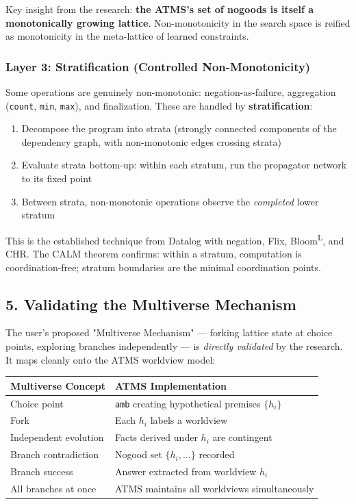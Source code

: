 \documentclass[11pt]{article}
\begin{document}
Key insight from the research: \textbf{the ATMS's set of nogoods is itself a
monotonically growing lattice}. Non-monotonicity in the search space is
reified as monotonicity in the meta-lattice of learned constraints.
\subsubsection{Layer 3: Stratification (Controlled Non-Monotonicity)}
\label{sec:orgcf440ca}

Some operations are genuinely non-monotonic: negation-as-failure,
aggregation (\texttt{count}, \texttt{min}, \texttt{max}), and finalization. These are handled
by \textbf{stratification}:

\begin{enumerate}
\item Decompose the program into strata (strongly connected components of
the dependency graph, with non-monotonic edges crossing strata)
\item Evaluate strata bottom-up: within each stratum, run the propagator
network to its fixed point
\item Between strata, non-monotonic operations observe the \emph{completed} lower
stratum
\end{enumerate}

This is the established technique from Datalog with negation, Flix,
Bloom\textsuperscript{L}, and CHR. The CALM theorem confirms: within a stratum,
computation is coordination-free; stratum boundaries are the minimal
coordination points.
\subsection{5. Validating the Multiverse Mechanism}
\label{sec:orga314ea8}

The user's proposed "Multiverse Mechanism" --- forking lattice state at
choice points, exploring branches independently --- is \emph{directly validated}
by the research. It maps cleanly onto the ATMS worldview model:

\begin{center}
\begin{tabular}{ll}
Multiverse Concept & ATMS Implementation\\
\hline
Choice point & \texttt{amb} creating hypothetical premises \(\{h_i\}\)\\
Fork & Each \(h_i\) labels a worldview\\
Independent evolution & Facts derived under \(h_i\) are contingent\\
Branch contradiction & Nogood set \(\{h_i, \ldots\}\) recorded\\
Branch success & Answer extracted from worldview \(h_i\)\\
All branches at once & ATMS maintains all worldviews simultaneously\\
\end{tabular}
\end{center}
\end{document}
